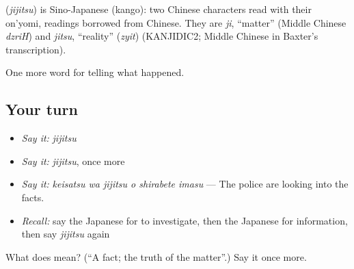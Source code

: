 \begin{cousinweb}
\textbf{} (\emph{jijitsu}) is Sino-Japanese (kango): two Chinese characters read with their on'yomi, readings borrowed from Chinese. They are \emph{ji}, \textquotedblleft{}matter\textquotedblright{} (Middle Chinese \emph{dzriH}) and \emph{jitsu}, \textquotedblleft{}reality\textquotedblright{} (\emph{zyit}) (KANJIDIC2; Middle Chinese in Baxter's transcription).
\end{cousinweb}

\begin{grammarlens}[title={What you've built}]
One more word for telling what happened.
\end{grammarlens}

\subsection*{Your turn}
\begin{itemize}
\raggedright
  \item \emph{Say it:} \emph{jijitsu}
  \item \emph{Say it:} \emph{jijitsu}, once more
  \item \emph{Say it:} \emph{keisatsu wa jijitsu o shirabete imasu} — The police are looking into the facts.
  \item \emph{Recall:} say the Japanese for to investigate, then the Japanese for information, then say \emph{jijitsu} again
\end{itemize}

\begin{tcolorbox}[breakable,colback=teal!4,colframe=teal!35!black,title={Before you move on}]
What does  mean? (\textquotedblleft{}A fact; the truth of the matter\textquotedblright{}.) Say it once more.
\end{tcolorbox}
